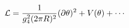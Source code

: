 \begin{equation}
{\cal L} = \frac{1}{g_4^2 (2 \pi R)^2} (\partial \theta)^2 + V(\theta) +
\cdots
\end{equation}

